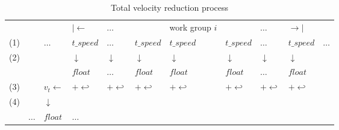 \documentclass[12pt, a4paper]{article}
\begin{document}
  \begin{table}[ht!]
    \centering
    \vspace{-0.5cm}
    \caption{Total velocity reduction process}
    \label{reduproc}
    \begin{tabular}{lllllllllll}
        &                              &                              & $| \leftarrow$                  & $\dots$                      &                                 & work group $i$                  &                                 & $\dots$                      & $\rightarrow |$                 &         \\ \cline{3-11}
    (1) &                              & \multicolumn{1}{l|}{$\dots$} & \multicolumn{1}{l|}{$t\_speed$} & \multicolumn{1}{l|}{$\dots$} & \multicolumn{1}{l|}{$t\_speed$} & \multicolumn{1}{l|}{$t\_speed$} & \multicolumn{1}{l|}{$t\_speed$} & \multicolumn{1}{l|}{$\dots$} & \multicolumn{1}{l|}{$t\_speed$} & $\dots$ \\ \cline{3-11}
    (2) &                              &                              & $\downarrow$                    & $\downarrow$                 & $\downarrow$                    & $\downarrow$                    & $\downarrow$                    & $\downarrow$                 & $\downarrow$                    &         \\ \cline{4-10}
     &                              & \multicolumn{1}{l|}{}        & \multicolumn{1}{l|}{$float$}    & \multicolumn{1}{l|}{$\dots$} & \multicolumn{1}{l|}{$float$}    & \multicolumn{1}{l|}{$float$}    & \multicolumn{1}{l|}{$float$}    & \multicolumn{1}{l|}{$\dots$} & \multicolumn{1}{l|}{$float$}    &         \\ \cline{4-10}
    (3) &                              & $v_t \leftarrow $                        & $+\hookleftarrow$               & $+\hookleftarrow$            & $+\hookleftarrow$               & $+\hookleftarrow$               & $+\hookleftarrow$               & $+\hookleftarrow$            & $+\hookleftarrow$               &         \\
    (4) &                              & $\downarrow$                 &                                 &                              &                                 &                                 &                                 &                              &                                 &         \\ \cline{2-4}
     & \multicolumn{1}{l|}{$\dots$} & \multicolumn{1}{l|}{$float$} & $\dots$                         &                              &                                 &                                 &                                 &                              &                                 &         \\ \cline{2-4}
    \end{tabular}
  \end{table}
\end{document}
